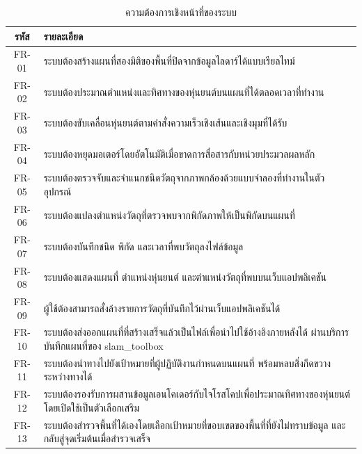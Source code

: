 \documentclass[a4paper,12pt]{report}
\begin{document}
\begin{table}[H]
\centering
\caption[ความต้องการเชิงหน้าที่ของระบบ (บทที่ 3)]{ความต้องการเชิงหน้าที่ของระบบ}
\label{tab:fr}
\small
\begin{tabularx}{\textwidth}{|c|X|}
\hline
\textbf{รหัส} & \textbf{รายละเอียด} \\
\hline
FR-01 & ระบบต้องสร้างแผนที่สองมิติของพื้นที่ปิดจากข้อมูลไลดาร์ได้แบบเรียลไทม์ \\
\hline
FR-02 & ระบบต้องประมาณตำแหน่งและทิศทางของหุ่นยนต์บนแผนที่ได้ตลอดเวลาที่ทำงาน \\
\hline
FR-03 & ระบบต้องขับเคลื่อนหุ่นยนต์ตามคำสั่งความเร็วเชิงเส้นและเชิงมุมที่ได้รับ \\
\hline
FR-04 & ระบบต้องหยุดมอเตอร์โดยอัตโนมัติเมื่อขาดการสื่อสารกับหน่วยประมวลผลหลัก \\
\hline
FR-05 & ระบบต้องตรวจจับและจำแนกชนิดวัตถุจากภาพกล้องด้วยแบบจำลองที่ทำงานในตัวอุปกรณ์ \\
\hline
FR-06 & ระบบต้องแปลงตำแหน่งวัตถุที่ตรวจพบจากพิกัดภาพให้เป็นพิกัดบนแผนที่ \\
\hline
FR-07 & ระบบต้องบันทึกชนิด พิกัด และเวลาที่พบวัตถุลงไฟล์ข้อมูล \\
\hline
FR-08 & ระบบต้องแสดงแผนที่ ตำแหน่งหุ่นยนต์ และตำแหน่งวัตถุที่พบบนเว็บแอปพลิเคชัน \\
\hline
FR-09 & ผู้ใช้ต้องสามารถสั่งล้างรายการวัตถุที่บันทึกไว้ผ่านเว็บแอปพลิเคชันได้ \\
\hline
FR-10 & ระบบต้องส่งออกแผนที่ที่สร้างเสร็จแล้วเป็นไฟล์เพื่อนำไปใช้อ้างอิงภายหลังได้
        ผ่านบริการบันทึกแผนที่ของ slam\_toolbox \\
\hline
FR-11 & ระบบต้องนำทางไปยังเป้าหมายที่ผู้ปฏิบัติงานกำหนดบนแผนที่
        พร้อมหลบสิ่งกีดขวางระหว่างทางได้ \\
\hline
FR-12 & ระบบต้องรองรับการผสานข้อมูลเอนโคเดอร์กับไจโรสโคปเพื่อประมาณทิศทางของหุ่นยนต์
        โดยเปิดใช้เป็นตัวเลือกเสริม \\
\hline
FR-13 & ระบบต้องสำรวจพื้นที่ได้เองโดยเลือกเป้าหมายที่ขอบเขตของพื้นที่ที่ยังไม่ทราบข้อมูล
        และกลับสู่จุดเริ่มต้นเมื่อสำรวจเสร็จ \\
\hline
\end{tabularx}
\end{table}
\end{document}
